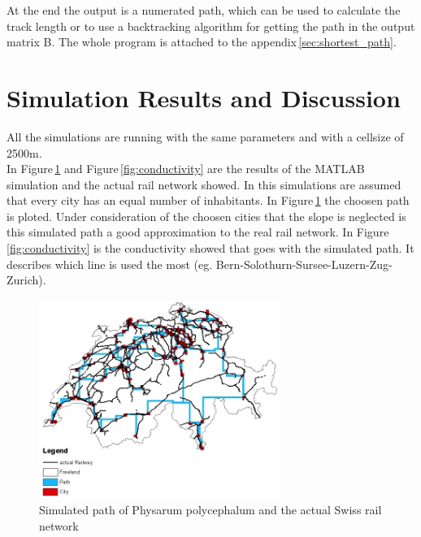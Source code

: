 \documentclass[11pt]{scrartcl}
\begin{document}
\null

At the end the output is a numerated path, which can be used to calculate the track length or to use a backtracking algorithm for getting the path in the output matrix B. The whole program is attached to the appendix\,\ref{sec:shortest_path}.



\section{Simulation Results and Discussion}
\label{sec:results}
All the simulations are running with the same parameters and with a cellsize of 2500m.
\\

In Figure\,\ref{fig:path} and Figure\,\ref{fig:conductivity} are the results of the MATLAB simulation and the actual rail network showed. In this simulations are assumed that every city has an equal number of inhabitants. In Figure\,\ref{fig:path} the choosen path is ploted. Under consideration of the choosen cities that the slope is neglected is this simulated path a good approximation to the real rail network. In Figure\,\ref{fig:conductivity} is the conductivity showed that goes with the simulated path. It describes which line is used the most (eg. Bern-Solothurn-Sursee-Luzern-Zug-Zurich).


\begin{figure}[H]
	\centering
	\includegraphics[width=0.7\textwidth]{figures/path_railway}
	\caption{Simulated path of Physarum polycephalum and the actual Swiss rail network}
	\label{fig:path}
\end{figure}
\end{document}
